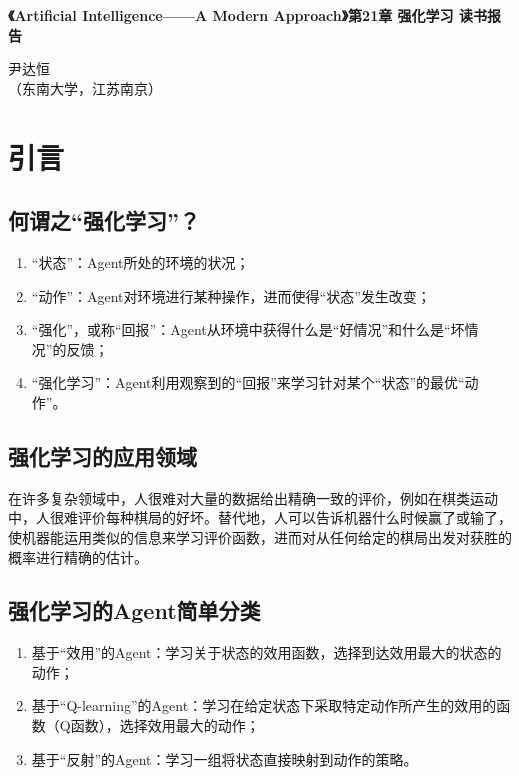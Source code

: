 \documentclass[a4paper]{ctexart}
\begin{document}
\begin{center}
	{\textbf{《Artificial Intelligence——A Modern Approach》第21章 强化学习 读书报告}}

	{尹达恒}\\[-1mm]

	{（东南大学，江苏\quad 南京）}
\end{center}
\renewcommand{\baselinestretch}{1.3}

\section{引言}

\subsection{何谓之“强化学习”？}

\begin{enumerate}[label=\arabic*、]
	\item “状态”：Agent所处的环境的状况；
	\item “动作”：Agent对环境进行某种操作，进而使得“状态”发生改变；
	\item “强化”，或称“回报”：Agent从环境中获得什么是“好情况”和什么是“坏情况”的反馈；
	\item “强化学习”：Agent利用观察到的“回报”来学习针对某个“状态”的最优“动作”。
\end{enumerate}

\subsection{强化学习的应用领域}

在许多复杂领域中，人很难对大量的数据给出精确一致的评价，例如在棋类运动中，人很难评价每种棋局的好坏。替代地，人可以告诉机器什么时候赢了或输了，使机器能运用类似的信息来学习评价函数，进而对从任何给定的棋局出发对获胜的概率进行精确的估计。

\subsection{强化学习的Agent简单分类}

\begin{enumerate}[label=\arabic*、]
	\item 基于“效用”的Agent：学习关于状态的效用函数，选择到达效用最大的状态的动作；
	\item 基于“Q-learning”的Agent：学习在给定状态下采取特定动作所产生的效用的函数（Q函数），选择效用最大的动作；
	\item 基于“反射”的Agent：学习一组将状态直接映射到动作的策略。
\end{enumerate}
\end{document}
